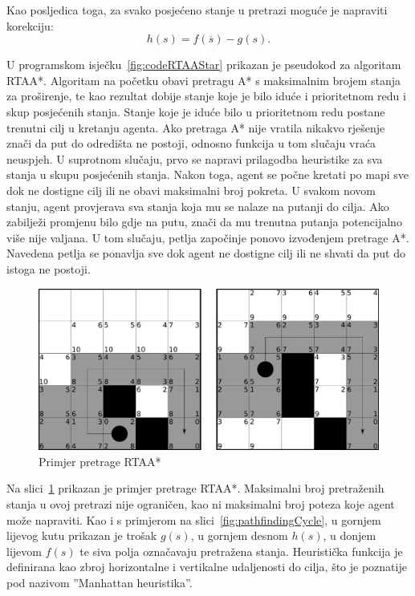 \documentclass[times, utf8, zavrsni, numeric]{fer}
\begin{document}
\par Kao posljedica toga, za svako posjećeno stanje u pretrazi moguće je napraviti korekciju:
\begin{equation}
h(s) = f(\overline{s}) - g(s).
\end{equation}

\begin{minipage}{\textwidth}
	
\end{minipage}

U programskom isječku~\ref{fig:codeRTAAStar} prikazan je pseudokod za algoritam RTAA*. 
Algoritam na početku obavi pretragu A* s maksimalnim brojem stanja za proširenje, te kao rezultat dobije stanje koje je bilo iduće i prioritetnom redu i skup posjećenih stanja.
Stanje koje je iduće bilo u prioritetnom redu postane trenutni cilj u kretanju agenta.
Ako pretraga A* nije vratila nikakvo rješenje znači da put do odredišta ne postoji, odnosno funkcija u tom slučaju vraća neuspjeh.
U suprotnom slučaju, prvo se napravi prilagodba heuristike za sva stanja u skupu posjećenih stanja.
Nakon toga, agent se počne kretati po mapi sve dok ne dostigne cilj ili ne obavi maksimalni broj pokreta.
U svakom novom stanju, agent provjerava sva stanja koja mu se nalaze na putanji do cilja.
Ako zabilježi promjenu bilo gdje na putu, znači da mu trenutna putanja potencijalno više nije valjana. 
U tom slučaju, petlja započinje ponovo izvođenjem pretrage A*.
Navedena petlja se ponavlja sve dok agent ne dostigne cilj ili ne shvati da put do istoga ne postoji.

\begin{figure}[h]
	\centering
	\includegraphics[width=0.9\linewidth]{images/rtaastar.pdf}
	\caption{Primjer pretrage RTAA*\cite{article:RTAAStar}}
	\label{fig:rtaastar}
\end{figure}

\par Na slici~\ref{fig:rtaastar} prikazan je primjer pretrage RTAA*.
Maksimalni broj pretraženih stanja u ovoj pretrazi nije ograničen, kao ni maksimalni broj poteza koje agent može napraviti.
Kao i s primjerom na slici~\ref{fig:pathfindingCycle}, u gornjem lijevog kutu prikazan je trošak \(g(s)\), u gornjem desnom \(h(s)\), u donjem lijevom \(f(s)\) te siva polja označavaju pretražena stanja.
Heuristička funkcija je definirana kao zbroj horizontalne i vertikalne udaljenosti do cilja, što je poznatije pod nazivom ''Manhattan heuristika''.
\end{document}
